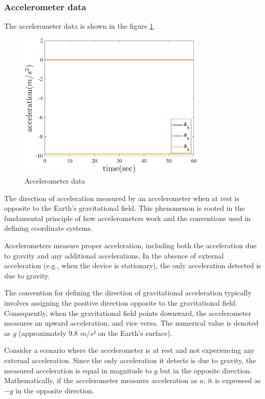 \subsubsection{Accelerometer data}
The accelerometer data is shown in the figure \ref{fig:accelerometer_data}.
\begin{figure}[H]
  \centering
  \includegraphics[width=0.8\textwidth]{../Figure/Q1/immovability}
  \caption{Accelerometer data}
  \label{fig:accelerometer_data}
\end{figure}
The direction of acceleration measured by an accelerometer when at rest is opposite to the Earth's gravitational field. This phenomenon is rooted in the fundamental principle of how accelerometers work and the conventions used in defining coordinate systems.

Accelerometers measure proper acceleration, including both the acceleration due to gravity and any additional accelerations. In the absence of external acceleration (e.g., when the device is stationary), the only acceleration detected is due to gravity.

The convention for defining the direction of gravitational acceleration typically involves assigning the positive direction opposite to the gravitational field. Consequently, when the gravitational field points downward, the accelerometer measures an upward acceleration, and vice versa. The numerical value is denoted as \(g\) (approximately 9.8 $m/s²$ on the Earth's surface).

Consider a scenario where the accelerometer is at rest and not experiencing any external acceleration. Since the only acceleration it detects is due to gravity, the measured acceleration is equal in magnitude to \(g\) but in the opposite direction. Mathematically, if the accelerometer measures acceleration as \(a\), it is expressed as \(-g\) in the opposite direction.

